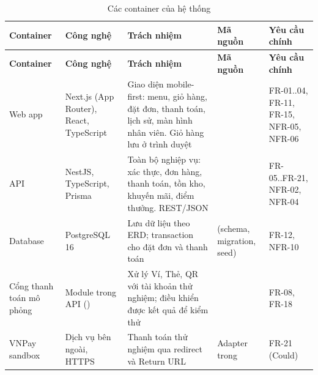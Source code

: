 {\small
\begin{longtable}{@{}L{2.2cm}L{2.6cm}L{4.6cm}L{2.4cm}L{2.1cm}@{}}
\caption{Các container của hệ thống}\label{tab:container}\\
\toprule
\textbf{Container} & \textbf{Công nghệ} & \textbf{Trách nhiệm} & \textbf{Mã nguồn} & \textbf{Yêu cầu chính} \\ \midrule \endfirsthead
\toprule \textbf{Container} & \textbf{Công nghệ} & \textbf{Trách nhiệm} & \textbf{Mã nguồn} & \textbf{Yêu cầu chính} \\ \midrule \endhead
\bottomrule \endfoot
Web app & Next.js (App Router), React, TypeScript & Giao diện mobile-first: menu, giỏ hàng, đặt đơn, thanh toán, lịch sử, màn hình nhân viên. Giỏ hàng lưu ở trình duyệt &  & FR-01..04, FR-11, FR-15, NFR-05, NFR-06 \\
API & NestJS, TypeScript, Prisma & Toàn bộ nghiệp vụ: xác thực, đơn hàng, thanh toán, tồn kho, khuyến mãi, điểm thưởng. REST/JSON &  & FR-05..FR-21, NFR-02, NFR-04 \\
Database & PostgreSQL 16 & Lưu dữ liệu theo ERD; transaction cho đặt đơn và thanh toán &  (schema, migration, seed) & FR-12, NFR-10 \\
Cổng thanh toán mô phỏng & Module trong API () & Xử lý Ví, Thẻ, QR với tài khoản thử nghiệm; điều khiển được kết quả để kiểm thử &  & FR-08, FR-18 \\
VNPay sandbox & Dịch vụ bên ngoài, HTTPS & Thanh toán thử nghiệm qua redirect và Return URL & Adapter  trong  & FR-21 (Could) \\
\end{longtable}
}